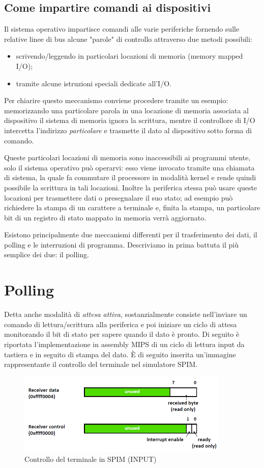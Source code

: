 \documentclass[class=book, crop=false, oneside]{standalone}
\begin{document}
\subsection{Come impartire comandi ai dispositivi}
Il sistema operativo impartisce comandi alle varie periferiche fornendo sulle relative linee di bus alcune "parole" di controllo attraverso due metodi possibili:
\begin{itemize}
	\item scrivendo/leggendo in particolari locazioni di memoria (memory mapped I/O);
	\item tramite alcune istruzioni speciali dedicate all'I/O.
\end{itemize}
Per chiarire questo meccanismo conviene procedere tramite un esempio:
memorizzando una particolare parola in una locazione di memoria associata al dispositivo il sistema di memoria ignora la scrittura, mentre il controllore di I/O intercetta l'indirizzo \emph{particolare} e trasmette il dato al dispositivo sotto forma di comando.

Queste particolari locazioni di memoria sono inaccessibili ai programmi utente, solo il sistema operativo può operarvi: esso viene invocato tramite una chiamata di sistema, la quale fa commutare il processore in modalità kernel e rende quindi possibile la scrittura in tali locazioni. Inoltre la periferica stessa può usare queste locazioni per trasmettere dati o presegnalare il suo stato; ad esempio può richiedere la stampa di un carattere a terminale e, finita la stampa, un particolare bit di un registro di stato mappato in memoria verrà aggiornato.

Esistono principalmente due meccanismi differenti per il trasferimento dei dati, il polling e le interruzioni di programma. Descriviamo in prima battuta il più semplice dei due: il polling.

\section{Polling}
Detta anche modalità di \emph{attesa attiva}, sostanzialmente consiste nell'inviare un comando di lettura/scrittura alla periferica e poi iniziare un ciclo di attesa monitorando il bit di stato per sapere quando il dato è pronto. Di seguito è riportata l'implementazione in assembly MIPS di un ciclo di lettura input da tastiera e in seguito di stampa del dato. È di seguito inserita un'immagine rappresentante il controllo del terminale nel simulatore SPIM.
\begin{figure}[H]
	\centering
	\includegraphics[width=0.9\textwidth,keepaspectratio]{SPIM1}
	\caption{Controllo del terminale in SPIM (INPUT)}
\end{figure}
\end{document}
